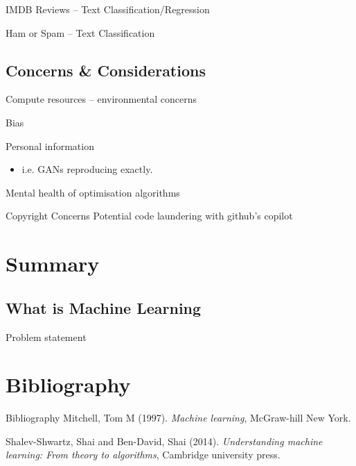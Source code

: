 \documentclass[10pt]{beamer}
\begin{document}
\begin{frame}[label={sec:org9b457aa}]{IMDB Reviews -- Text Classification/Regression}
\end{frame}

\begin{frame}[label={sec:orge0bd6a8}]{Ham or Spam -- Text Classification}
\end{frame}

\subsection*{Concerns \& Considerations}
\label{sec:org72c413d}

\begin{frame}[label={sec:org2b4ed76}]{Compute resources -- environmental concerns}
\end{frame}

\begin{frame}[label={sec:org3875f8a}]{Bias}
\end{frame}

\begin{frame}[label={sec:orgd4134de}]{Personal information}
\begin{itemize}
\item i.e. GANs reproducing exactly.
\end{itemize}
\end{frame}

\begin{frame}[label={sec:org0e5a3f7}]{Mental health of optimisation algorithms}
\end{frame}

\begin{frame}[label={sec:orgec82513}]{Copyright Concerns}
Potential code laundering with github's copilot
\end{frame}

\section*{Summary}
\label{sec:org48e733e}

\subsection*{What is Machine Learning}
\label{sec:orgd17b4c3}

\begin{frame}[label={sec:orge67f5ba}]{Problem statement}
\end{frame}

\section*{Bibliography}
\label{sec:org7d27301}

\begin{frame}[label={sec:orgdd682e3}]{Bibliography}
\noindent
Mitchell, Tom M (1997). \emph{Machine learning}, McGraw-hill New York.

\noindent
Shalev-Shwartz, Shai and Ben-David, Shai (2014). \emph{Understanding machine learning: From theory to algorithms}, Cambridge university press.
\end{frame}
\end{document}
